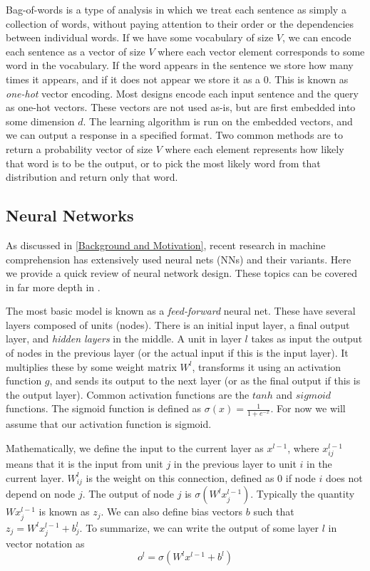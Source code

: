 \documentclass[pageno]{jpaper}
\begin{document}
Bag-of-words is a type of analysis in which we treat each sentence as simply a
collection of words, without paying attention to their order or the
dependencies between individual words. If we have some vocabulary of size $V$,
we can encode each sentence as a vector of size $V$ where each vector element
corresponds to some word in the vocabulary. If the word appears in the sentence
we store how many times it appears, and if it does not appear we store it as a
0. This is known as \textit{one-hot} vector encoding. Most designs encode each input
sentence and the query as one-hot vectors. These vectors are not used
as-is, but are first embedded into some dimension $d$. The learning algorithm
is run on the embedded vectors, and we can output a response in a specified
format. Two common methods are to return a probability vector of size $V$ where
each element represents how likely that word is to be the output, or to pick
the most likely word from that distribution and return only that word.

\subsection{Neural Networks}
\label{Neural Networks}

As discussed in \ref{Background and Motivation}, recent research in machine
comprehension has extensively used neural nets (NNs) and their variants. Here we
provide a quick review of neural network design. These topics can be covered in
far more depth in \cite{Bishop2006}.

The most basic model is known as a \textit{feed-forward} neural net. These have
several layers composed of units (nodes). There is an initial input layer, a
final output layer, and \textit{hidden layers} in the middle. A unit in layer
$l$ takes as input the output of nodes in the previous layer (or the actual
input if this is the input layer). It multiplies these by some weight matrix
$W^l$, transforms it using an activation function $g$, and sends its output to the
next layer (or as the final output if this is the output layer). Common
activation functions are the $tanh$ and $sigmoid$ functions. The sigmoid
function is defined as $\sigma (x) = \frac{1}{1+e^{-x}}$. For now we will assume
that our activation function is sigmoid.

Mathematically, we define the input to the current layer as $x^{l-1}$,
where $x^{l-1}_{ij}$ means that it is the input from unit $j$ in the previous
layer to unit $i$ in the current layer. $W^l_{ij}$ is the weight on this
connection, defined as 0 if node $i$ does not depend on node $j$. The output of
node $j$ is $\sigma ( W^l x^{l-1}_j)$. Typically the quantity $Wx^{l-1}_j$ is
known as $z_j$. We can also define bias vectors $b$ such that $z_j =
W^lx^{l-1}_j + b^l_j$. To summarize, we can write the output of some layer $l$
in vector notation as
$$o^l = \sigma(W^lx^{l-1} + b^l)$$
\end{document}
